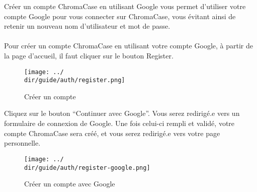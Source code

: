 Créer un compte ChromaCase en utilisant Google vous permet d’utiliser votre compte Google pour vous connecter sur ChromaCase, vous évitant ainsi de retenir un nouveau nom d’utilisateur et mot de passe.
\\\\
Pour créer un compte ChromaCase en utilisant votre compte Google, à partir de la page d’accueil, il faut cliquer sur le bouton Register.
\begin{figure}[H]
	\texttt{[image: ../\\dir/guide/auth/register.png]}
	\caption{Créer un compte}
\end{figure}

Cliquez sur le bouton “Continuer avec Google”. Vous serez redirigé.e vers un formulaire de connexion de Google. Une fois celui-ci rempli et validé, votre compte ChromaCase sera créé, et vous serez redirigé.e vers votre page personnelle.

\begin{figure}[H]
	\begin{center}
		\texttt{[image: ../\\dir/guide/auth/register-google.png]}
	\end{center}
	\caption{Créer un compte avec Google}
\end{figure}